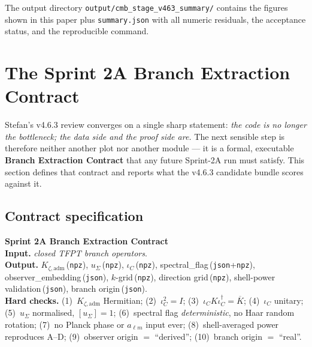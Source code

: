 \documentclass[11pt,a4paper]{article}
\begin{document}
The output directory \texttt{output/cmb\_stage\_v463\_summary/}
contains the figures shown in this paper plus
\texttt{summary.json} with all numeric residuals, the acceptance
status, and the reproducible command.

\section{The Sprint 2A Branch Extraction Contract}
\label{sec:sprint2a}

Stefan's v4.6.3 review converges on a single sharp statement:
\emph{the code is no longer the bottleneck; the data side and the
proof side are.}  The next sensible step is therefore neither another
plot nor another module --- it is a formal, executable
\textbf{Branch Extraction Contract} that any future Sprint-2A run must
satisfy.  This section defines that contract and reports what the
v4.6.3 candidate bundle scores against it.

\subsection{Contract specification}

\begin{tfptwarningbox}
\textbf{Sprint 2A Branch Extraction Contract}\\
\textbf{Input.} \emph{closed TFPT branch operators}.\\
\textbf{Output.}
\(K_{\zeta,\mathrm{adm}}\)\,(\texttt{npz}),
\(u_\Sigma\)\,(\texttt{npz}),
\(\iota_C\)\,(\texttt{npz}),
spectral\_flag\,(\texttt{json}+\texttt{npz}),
observer\_embedding\,(\texttt{json}),
\(k\)-grid\,(\texttt{npz}), direction grid\,(\texttt{npz}),
shell-power validation\,(\texttt{json}), branch origin\,(\texttt{json}).\\
\textbf{Hard checks.}
(1)~\(K_{\zeta,\mathrm{adm}}\) Hermitian;
(2)~\(\iota_C^2=I\);
(3)~\(\iota_C K \iota_C^\dagger=\overline{K}\);
(4)~\(\iota_C\) unitary;
(5)~\(u_\Sigma\) normalised, \([u_\Sigma]=1\);
(6)~spectral flag \emph{deterministic}, no Haar random rotation;
(7)~no Planck phase or \(a_{\ell m}\) input ever;
(8)~shell-averaged power reproduces A--D;
(9)~observer origin \(=\) ``derived'';
(10)~branch origin \(=\) ``real''.
\end{tfptwarningbox}
\end{document}
